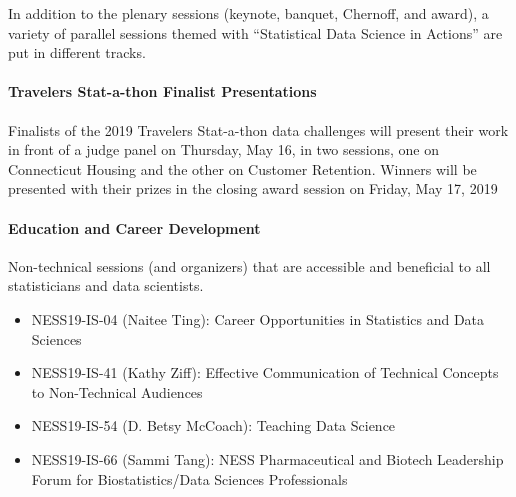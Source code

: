 \documentclass[12pt]{article}
\begin{document}
In addition to the plenary sessions (keynote, banquet, Chernoff, and
award), a variety of parallel sessions themed with ``Statistical Data
Science in Actions'' are put in different tracks.

\paragraph{Travelers Stat-a-thon Finalist Presentations}
Finalists of the 2019 Travelers Stat-a-thon data challenges will
present their work in front of a judge panel on Thursday, May 16, in
two sessions, one on Connecticut Housing and the other on Customer
Retention. Winners will be presented with their prizes in the closing
award session on Friday, May 17, 2019

\paragraph{Education and Career Development}
Non-technical sessions (and organizers) that are accessible and beneficial to all
statisticians and data scientists.
\begin{itemize}
\item
NESS19-IS-04 (Naitee Ting): Career Opportunities in Statistics and Data
Sciences
\item
NESS19-IS-41 (Kathy Ziff): Effective Communication of Technical
Concepts to Non-Technical Audiences
\item
NESS19-IS-54 (D. Betsy McCoach): Teaching Data Science
\item
NESS19-IS-66  (Sammi Tang): NESS Pharmaceutical and Biotech Leadership
Forum for Biostatistics/Data Sciences Professionals
\end{itemize}
\end{document}
